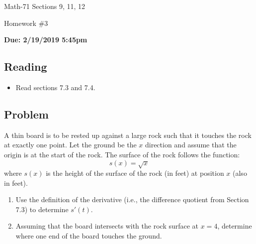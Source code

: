 \documentclass[letterpaper,12pt,fleqn]{article}
\begin{document}
\begin{center}
  \large
  Math-71 Sections 9, 11, 12

  \Large
  Homework \#3

  \large
  \textbf{Due: 2/19/2019 5:45pm}
\end{center}

\subsection*{Reading}

\begin{itemize}
\item Read sections 7.3 and 7.4.
\end{itemize}

\subsection*{Problem}

A thin board is to be rested up against a large rock such that it touches the rock at exactly one point.  Let the ground be the
\(x\) direction and assume that the origin is at the start of the rock.  The surface of the rock follows the function:
\[s(x)=\sqrt{x}\]
where \(s(x)\) is the height of the surface of the rock (in feet) at position \(x\) (also in feet).
\begin{enumerate}
\item Use the definition of the derivative (i.e., the difference quotient from Section 7.3) to determine \(s'(t)\).
\item Assuming that the board intersects with the rock surface at \(x=4\), determine where one end of the board touches the
  ground.
\end{enumerate}
\end{document}
